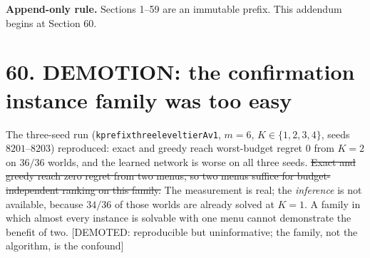 \documentclass[9pt,twocolumn]{article}
\newcommand{\oldclaim}[1]{\sout{#1}}
\newcommand{\eclass}[1]{\textsf{[#1]}}
\renewcommand{\_}{\CIGunderscore\allowbreak}
\begin{document}
\sloppy
\twocolumn[{\begin{center}
{\LARGE\bfseries Report 4 - Structural Rankability}\\[2pt]
{\large\itshape Append-only update: why the three-seed confirmation showed nothing, and an exact staircase family with known prefix-cover dimension $\chi=r$}\\[2pt]
{\small CIG-AMF Scientific Evolution Report -- 7 September (evening)}
\end{center}\vspace{2mm}}]

\textbf{Append-only rule.} Sections 1--59 are an immutable prefix. This addendum begins at Section 60.

\section*{60. DEMOTION: the confirmation instance family was too easy}
The three-seed run (\texttt{kprefix\_three\_level\_tierA\_v1}, $m=6$, $K\in\{1,2,3,4\}$, seeds $8201$--$8203$) reproduced: exact and greedy reach worst-budget regret $0$ from $K=2$ on $36/36$ worlds, and the learned network is worse on all three seeds. \oldclaim{Exact and greedy reach zero regret from two menus, so two menus suffice for budget-independent ranking on this family.} The measurement is real; the \emph{inference} is not available, because $34/36$ of those worlds are already solved at $K=1$. A family in which almost every instance is solvable with one menu cannot demonstrate the benefit of two. \eclass{DEMOTED: reproducible but uninformative; the family, not the algorithm, is the confound}
\end{document}
